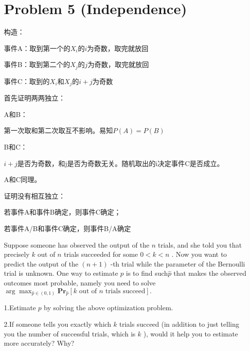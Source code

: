 \documentclass[12pt, a4paper, oneside]{ctexart}
\begin{document}
\section*{Problem 5 (Independence)}
\begin{problem}
\end{problem}
\begin{solution}
  构造：

  事件A：取到第一个的$X_i$的$i$为奇数，取完就放回

  事件B：取到第二个的$X_j$的$j$为奇数，取完就放回

  事件C：取到的$X_i$和$X_j$的$i+j$为奇数

  首先证明两两独立：

  A和B：

  第一次取和第二次取互不影响。易知$P(A)=P(B)$

  B和C：

  $i+j$是否为奇数，和j是否为奇数无关。随机取出的i决定事件C是否成立。

  A和C同理。

  证明没有相互独立：

  若事件A和事件B确定，则事件C确定；

  若事件A/B和事件C确定，则事件B/A确定
\end{solution}
\begin{problem}
Suppose someone has observed the output of the $n$
trials, and she told you that precisely $k$
out of $n$
trials succeeded for some $0<k<n$
. Now you want to predict the output of the $(n+1)$
-th trial while the parameter
of the Bernoulli trial is unknown. One way to estimate $p$
is to find such$ \hat{p}$
that makes the observed outcomes most probable, namely you need to solve$ \arg \max_{\hat{p}\in(0,1)} \mathbf{Pr}_{\hat{p}} [k \text{ out of } n\text{ trials succeed}].$


1.Estimate $p$
by solving the above optimization problem.

2.If someone tells you exactly which $k$
trials succeed (in addition to just telling you the number of successful trials, which is $k$
), would it help you to estimate
more accurately? Why?
\end{problem}
\end{document}
